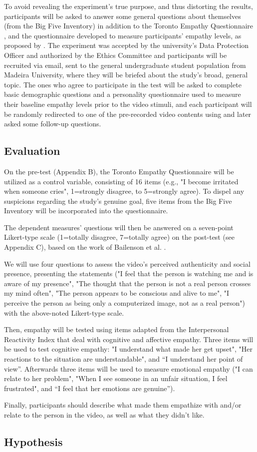 To avoid revealing the experiment's true purpose, and thus distorting the results, participants will be asked to answer some general questions about themselves (from the Big Five Inventory) in addition to the Toronto Empathy Questionnaire \cite{SPR03}, and the questionnaire developed to measure participants' empathy levels, as proposed by \cite{ROT19, ZIB19}. 
The experiment was accepted by the university's Data Protection Officer and authorized by the Ethics Committee and participants will be recruited via email, sent to the general undergraduate student population from Madeira University, where they will be briefed about the study's broad, general topic.
The ones who agree to participate in the test will be asked to complete basic demographic questions and a personality questionnaire used to measure their baseline empathy levels prior to the video stimuli, and each participant will be randomly redirected to one of the pre-recorded video contents using \cite{FER19} and later asked some follow-up questions.

\subsection{Evaluation}
On the pre-test (Appendix B), the Toronto Empathy Questionnaire \cite{SPR03} will be utilized as a control variable, consisting of 16 items (e.g., "I become irritated when someone cries", 1=strongly disagree, to 5=strongly agree). To dispel any suspicions regarding the study's genuine goal, five items from the Big Five Inventory \cite{JOH91} will be incorporated into the questionnaire.

The dependent measures' questions will then be answered on a seven-point Likert-type scale (1=totally disagree, 7=totally agree) on the post-test (see Appendix C), based on the work of Bailenson et al. \cite{BAI03}.

We will use four questions to assess the video's perceived authenticity and social presence, presenting the statements ("I feel that the person is watching me and is aware of my presence", "The thought that the person is not a real person crosses my mind often", "The person appears to be conscious and alive to me", "I perceive the person as being only a computerized image, not as a real person") with the above-noted Likert-type scale.

Then, empathy will be tested using items adapted from the Interpersonal Reactivity Index \cite{DAV83} that deal with cognitive and affective empathy. Three items will be used to test cognitive empathy: "I understand what made her get upset", "Her reactions to the situation are understandable", and “I understand her point of view”. Afterwards three items will be used to measure emotional empathy ("I can relate to her problem", "When I see someone in an unfair situation, I feel frustrated", and “I feel that her emotions are genuine”).

Finally, participants should describe what made them empathize with and/or relate to the person in the video, as well as what they didn't like.

\subsection{Hypothesis}